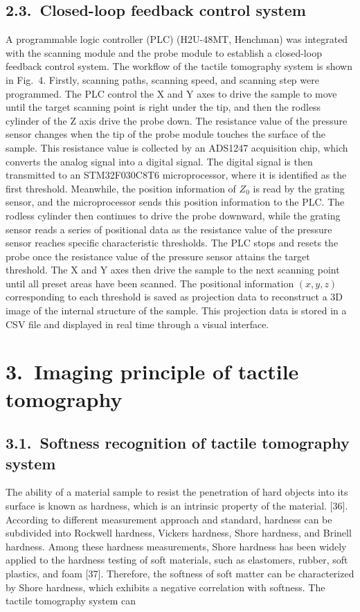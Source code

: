 \documentclass[11pt]{article}
\begin{document}
\subsection*{2.3.\ Closed-loop feedback control system}

A programmable logic controller (PLC) (H2U-48MT, Henchman) was
integrated with the scanning module and the probe module to
establish a closed-loop feedback control system. The workflow of
the tactile tomography system is shown in Fig.~4. Firstly, scanning
paths, scanning speed, and scanning step were programmed. The PLC
control the X and Y axes to drive the sample to move until the
target scanning point is right under the tip, and then the rodless
cylinder of the Z axis drive the probe down. The resistance value
of the pressure sensor changes when the tip of the probe module
touches the surface of the sample. This resistance value is
collected by an ADS1247 acquisition chip, which converts the analog
signal into a digital signal. The digital signal is then
transmitted to an STM32F030C8T6 microprocessor, where it is
identified as the first threshold. Meanwhile, the position
information of $Z_0$ is read by the grating sensor, and the
microprocessor sends this position information to the PLC. The
rodless cylinder then continues to drive the probe downward, while
the grating sensor reads a series of positional data as the
resistance value of the pressure sensor reaches specific
characteristic thresholds. The PLC stops and resets the probe once
the resistance value of the pressure sensor attains the target
threshold. The X and Y axes then drive the sample to the next
scanning point until all preset areas have been scanned. The
positional information $(x, y, z)$ corresponding to each threshold
is saved as projection data to reconstruct a 3D image of the
internal structure of the sample. This projection data is stored
in a CSV file and displayed in real time through a visual
interface.

\section*{3.\ Imaging principle of tactile tomography}

\subsection*{3.1.\ Softness recognition of tactile tomography system}

The ability of a material sample to resist the penetration of hard
objects into its surface is known as hardness, which is an intrinsic
property of the material. [36]. According to different measurement
approach and standard, hardness can be subdivided into Rockwell
hardness, Vickers hardness, Shore hardness, and Brinell hardness.
Among these hardness measurements, Shore hardness has been widely
applied to the hardness testing of soft materials, such as
elastomers, rubber, soft plastics, and foam [37]. Therefore, the
softness of soft matter can be characterized by Shore hardness,
which exhibits a negative correlation with softness. The tactile
tomography system can
\end{document}
